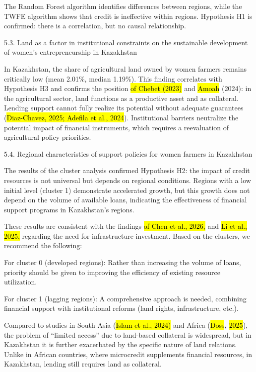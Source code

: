 The Random Forest algorithm identifies differences between regions,
while the TWFE algorithm shows that credit is ineffective within
regions. Hypothesis H1 is confirmed: there is a correlation, but no
causal relationship.

5.3. Land as a factor in institutional constraints on the sustainable
development of women's entrepreneurship in Kazakhstan

In Kazakhstan, the share of agricultural land owned by women farmers
remains critically low (mean 2.01\%, median 1.19\%). This finding
correlates with Hypothesis H3 and confirms the position \hl{of Chebet
(2023)} and \hl{Amoah} (2024): in the agricultural sector, land
functions as a productive asset and as collateral. Lending support
cannot fully realize its potential without adequate guarantees
(\hl{Diaz-Chavez, 2025; Adefila et al., 2024}). Institutional barriers
neutralize the potential impact of financial instruments, which requires
a reevaluation of agricultural policy priorities.

5.4. Regional characteristics of support policies for women farmers in
Kazakhstan

The results of the cluster analysis confirmed Hypothesis H2: the impact
of credit resources is not universal but depends on regional conditions.
Regions with a low initial level (cluster 1) demonstrate accelerated
growth, but this growth does not depend on the volume of available
loans, indicating the effectiveness of financial support programs in
Kazakhstan's regions.

These results are consistent with the findings \hl{of Chen et al.,
2026,} and \hl{Li et al., 2025,} regarding the need for infrastructure
investment. Based on the clusters, we recommend the following:

For cluster 0 (developed regions): Rather than increasing the volume of
loans, priority should be given to improving the efficiency of existing
resource utilization.

For cluster 1 (lagging regions): A comprehensive approach is needed,
combining financial support with institutional reforms (land rights,
infrastructure, etc.).

Compared to studies in South Asia (\hl{Islam et al., 2024)} and Africa
(\hl{Doss}\textbf{,} \hl{2025}), the problem of ``limited access'' due
to land-based collateral is widespread, but in Kazakhstan it is further
exacerbated by the specific nature of land relations. Unlike in African
countries, where microcredit supplements financial resources, in
Kazakhstan, lending still requires land as collateral.

